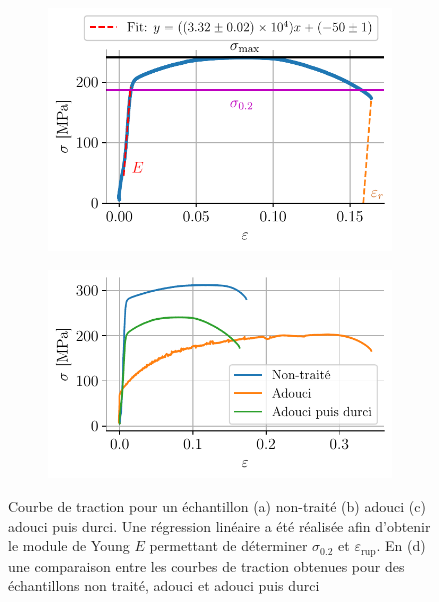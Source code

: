 \begin{figure}[h!]
\begin{subfigure}{0.48\linewidth}
        \includegraphics[width=\linewidth]{figures/tiede6all.pdf}
        \caption{}
        \label{fig:tiede6}
    \end{subfigure}
    \begin{subfigure}{0.48\linewidth}
        \centering
        \includegraphics[width=\linewidth]{figures/comparaison.pdf}
        \caption{}
        \label{fig:comparaison}
    \end{subfigure}
    \caption{Courbe de traction pour un échantillon (a) non-traité (b) adouci (c) adouci puis durci. Une régression linéaire a été réalisée afin d'obtenir le module de Young \(E\) permettant de déterminer \(\sigma_{0.2}\) et \(\varepsilon_{\textrm{rup}}\). En (d) une comparaison entre les courbes de traction obtenues pour des échantillons non traité, adouci et adouci puis durci}
    \label{fig:tractions_exp}
\end{figure}


